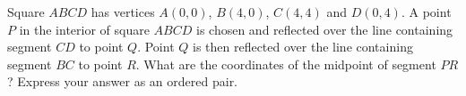 Square $ABCD$ has vertices $A(0,0)$, $B(4,0)$, $C(4,4)$ and $D(0,4)$. A point $P$ in the interior of square $ABCD$ is chosen and reflected over the line containing segment $CD$ to point $Q$. Point $Q$ is then reflected over the line containing segment $BC$ to point $R$. What are the coordinates of the midpoint of segment $PR$? Express your answer as an ordered pair.
